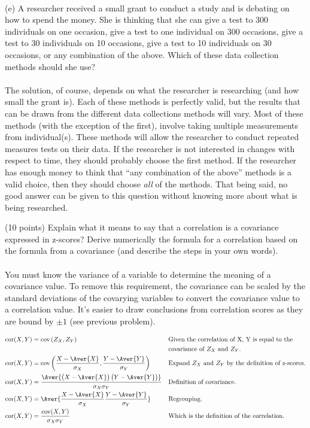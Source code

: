 \documentclass[onecolumn,10pt]{jhwhw}
\begin{document}
\\
(e) A researcher received a small grant to conduct a study and is debating on how to spend the money. She is thinking that she can give a test to 300 individuals on one occasion, give a test to one individual on 300 occasions, give a test to 30 individuals on 10 occasions, give a test to 10 individuals on 30 occasions, or any combination of the above. Which of these data collection methods should she use?\\
\\
The solution, of course, depends on what the researcher is researching (and how small the grant is). Each of these methods is perfectly valid, but the results that can be drawn from the different data collections methods will vary. Most of these methods (with the exception of the first), involve taking multiple measurements from individual(s). These methods will allow the researcher to conduct repeated measures tests on their data. If the researcher is not interested in changes with respect to time, they should probably choose the first method. If the researcher has enough money to think that ``any combination of the above'' methods is a valid choice, then they should choose \textit{all} of the methods. That being said, no good answer can be given to this question without knowing more about what is being researched.

\clearpage
{}

(10 points) Explain what it means to say that a correlation is a covariance expressed in z-scores? Derive numerically the formula for a correlation based on the formula from a covariance (and describe the steps in your own words).\\
\\
You must know the variance of a variable to determine the meaning of a covariance value. To remove this requirement, the covariance can be scaled by the standard deviations of the covarying variables to convert the covariance value to a correlation value. It's easier to draw conclusions from correlation scores as they are bound by $\pm 1$ (see previous problem).

\begin{align*}
\mbox{cor}(X, Y) &= \mbox{cov}\left( Z_X, Z_Y \right) && \text{Given the correlation of X, Y is equal to the} \\
& && \text{covariance of $Z_X$ and $Z_Y$.} \\
\mbox{cor}(X, Y) &= \mbox{cov} \left(\frac{X - \Aver{X}}{\sigma_X}, \frac{Y - \Aver{Y}}{\sigma_Y} \right) && \text{Expand $Z_X$ and $Z_Y$ by the definition of z-scores.}\\
\mbox{cor}(X, Y) &= \frac{\Aver{\left(X - \Aver{X} \right) \left(Y - \Aver{Y} \right) }}{\sigma_X \sigma_Y} && \text{Definition of covariance.} \\
\mbox{cor}(X, Y) &= \Aver{\frac{X - \Aver{X}}{\sigma_X } \frac{Y - \Aver{Y} }{\sigma_Y}} && \text{Regrouping.} \\
\mbox{cor}(X, Y) &= \frac{\mbox{cov}(X, Y)}{\sigma_X \sigma_Y} && \text{Which is the definition of the correlation.} \\
\end{align*}
\end{document}
